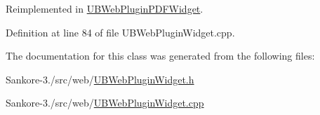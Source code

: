 Reimplemented in \hyperlink{class_u_b_web_plugin_p_d_f_widget_a650cacdfc6f5cf51f8464ca7bfdfab9e}{U\-B\-Web\-Plugin\-P\-D\-F\-Widget}.



Definition at line 84 of file U\-B\-Web\-Plugin\-Widget.\-cpp.



The documentation for this class was generated from the following files\-:\begin{DoxyCompactItemize}
\item 
Sankore-\/3./src/web/\hyperlink{_u_b_web_plugin_widget_8h}{U\-B\-Web\-Plugin\-Widget.\-h}\item 
Sankore-\/3./src/web/\hyperlink{_u_b_web_plugin_widget_8cpp}{U\-B\-Web\-Plugin\-Widget.\-cpp}\end{DoxyCompactItemize}
